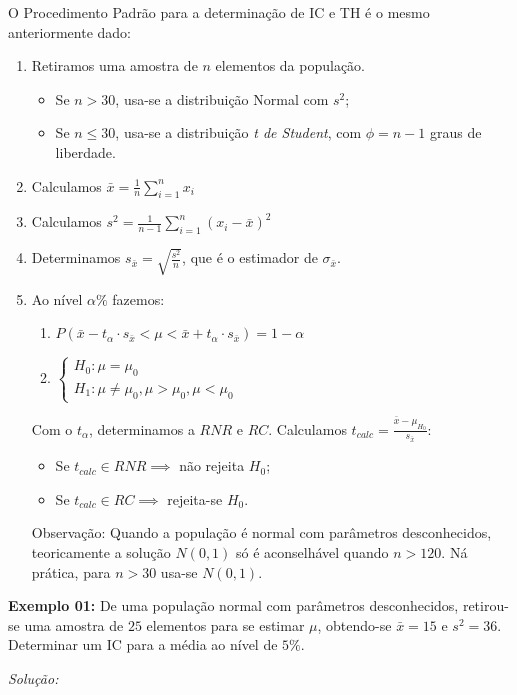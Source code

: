 \documentclass[oneside,a4paper,12pt]{article}
\begin{document}
O Procedimento Padrão para a determinação de IC e TH é o mesmo anteriormente dado:
\begin{enumerate}
	\item Retiramos uma amostra de $n$ elementos da população.
	\begin{itemize}
		\item Se $n > 30$, usa-se a distribuição Normal com $s^2$;
		\item Se $n \leq 30$, usa-se a distribuição \emph{t de Student}, com $\phi = n - 1$ graus de liberdade.
	\end{itemize}
	\item Calculamos $\bar{x} = \displaystyle \frac{1}{n}\sum_{i = 1}^{n}x_i$
	\item Calculamos $s^2 = \displaystyle \frac{1}{n-1}\sum_{i=1}^{n}(x_i - \bar{x})^2$
	\item Determinamos $s_{\bar{x}}=\displaystyle \sqrt{\frac{s^2}{n}}$, que é o estimador de $\sigma_{\bar{x}}$.
	\item Ao nível $\alpha\%$ fazemos:
	\begin{enumerate}
		\item $P(\bar{x}-t_{\alpha}\cdot s_{\bar{x}}<\mu<\bar{x}+t_{\alpha}\cdot s_{\bar{x}}) = 1 - \alpha$
		\item $\begin{cases}
			H_0:\mu=\mu_0\\
			H_1:\mu\neq\mu_0,\mu > \mu_0, \mu < \mu_0
		\end{cases}$
	\end{enumerate}
	Com o $t_{\alpha}$, determinamos a $RNR$ e $RC$. Calculamos $t_{calc} = \displaystyle \frac{\bar{x} - \mu_{H_0}}{s_{\bar{x}}}$:
	\begin{itemize}
		\item Se $t_{calc} \in RNR \implies$ não rejeita $H_0$;
		\item Se $t_{calc} \in RC \implies$ rejeita-se $H_0$.
	\end{itemize}
	Observação: Quando a população é normal com parâmetros desconhecidos, teoricamente a solução $N(0,1)$ só é aconselhável quando $n>120$. Ná prática, para $n>30$ usa-se $N(0,1)$.
\end{enumerate}

\textbf{Exemplo 01:} De uma população normal com parâmetros desconhecidos, retirou-se uma amostra de $25$ elementos para se estimar $\mu$, obtendo-se $\bar{x} = 15$ e $s^2 = 36$. Determinar um IC para a média ao nível de $5\%$.

\textit{Solução:}
\end{document}
